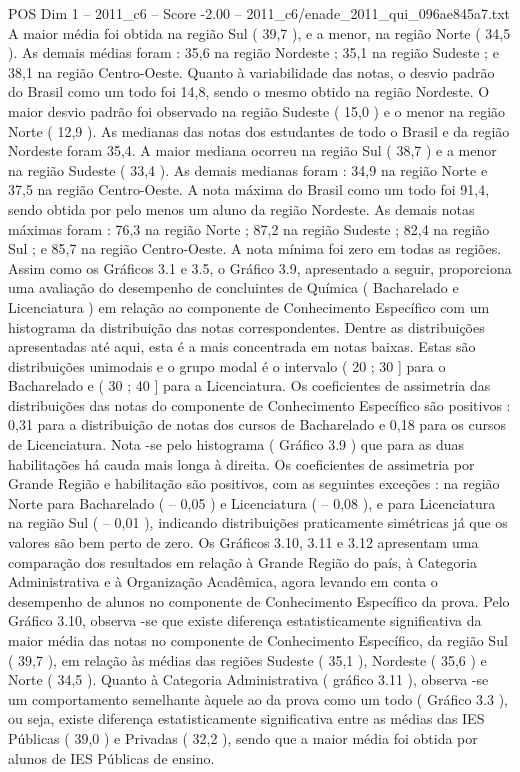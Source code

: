 \begin{textsample}{POS Dim 1 – 2011\_c6 – Score -2.00 – 2011\_c6/enade\_2011\_qui\_096ae845a7.txt}
A maior média foi obtida na região Sul ( 39,7 ), e a menor, na região Norte ( 34,5 ).
As demais médias foram : 35,6 na região Nordeste ; 35,1 na região Sudeste ; e 38,1 na região Centro-Oeste.
Quanto à variabilidade das notas, o desvio padrão do Brasil como um todo foi 14,8, sendo o mesmo obtido na região Nordeste.
O maior desvio padrão foi observado na região Sudeste ( 15,0 ) e o menor na região Norte ( 12,9 ).
As medianas das notas dos estudantes de todo o Brasil e da região Nordeste foram 35,4.
A maior mediana ocorreu na região Sul ( 38,7 ) e a menor na região Sudeste ( 33,4 ).
As demais medianas foram : 34,9 na região Norte e 37,5 na região Centro-Oeste.
A nota máxima do Brasil como um todo foi 91,4, sendo obtida por pelo menos um aluno da região Nordeste.
As demais notas máximas foram : 76,3 na região Norte ; 87,2 na região Sudeste ; 82,4 na região Sul ; e 85,7 na região Centro-Oeste.
A nota mínima foi zero em todas as regiões.
Assim como os Gráficos 3.1 e 3.5, o Gráfico 3.9, apresentado a seguir, proporciona uma avaliação do desempenho de concluintes de Química ( Bacharelado e Licenciatura ) em relação ao componente de Conhecimento Específico com um histograma da distribuição das notas correspondentes.
Dentre as distribuições apresentadas até aqui, esta é a mais concentrada em notas baixas.
Estas são distribuições unimodais e o grupo modal é o intervalo ( 20 ; 30 ] para o Bacharelado e ( 30 ; 40 ] para a Licenciatura.
Os coeficientes de assimetria das distribuições das notas do componente de Conhecimento Específico são positivos : 0,31 para a distribuição de notas dos cursos de Bacharelado e 0,18 para os cursos de Licenciatura.
Nota -se pelo histograma ( Gráfico 3.9 ) que para as duas habilitações há cauda mais longa à direita.
Os coeficientes de assimetria por Grande Região e habilitação são positivos, com as seguintes exceções : na região Norte para Bacharelado ( – 0,05 ) e Licenciatura ( – 0,08 ), e para Licenciatura na região Sul ( – 0,01 ), indicando distribuições praticamente simétricas já que os valores são bem perto de zero.
Os Gráficos 3.10, 3.11 e 3.12 apresentam uma comparação dos resultados em relação à Grande Região do país, à Categoria Administrativa e à Organização Acadêmica, agora levando em conta o desempenho de alunos no componente de Conhecimento Específico da prova.
Pelo Gráfico 3.10, observa -se que existe diferença estatisticamente significativa da maior média das notas no componente de Conhecimento Específico, da região Sul ( 39,7 ), em relação às médias das regiões Sudeste ( 35,1 ), Nordeste ( 35,6 ) e Norte ( 34,5 ).
Quanto à Categoria Administrativa ( gráfico 3.11 ), observa -se um comportamento semelhante àquele ao da prova como um todo ( Gráfico 3.3 ), ou seja, existe diferença estatisticamente significativa entre as médias das IES Públicas ( 39,0 ) e Privadas ( 32,2 ), sendo que a maior média foi obtida por alunos de IES Públicas de ensino.

\end{textsample}
